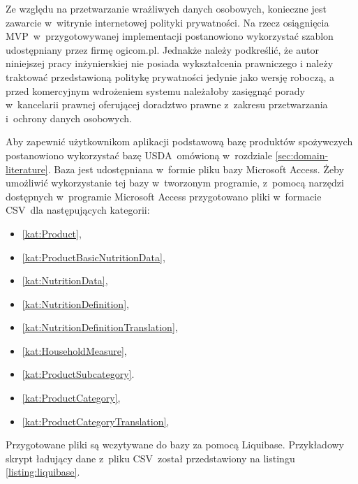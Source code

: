 \par
Ze względu na przetwarzanie wrażliwych danych osobowych, konieczne jest zawarcie w~witrynie internetowej polityki prywatności.
Na rzecz osiągnięcia MVP~w~przygotowywanej implementacji postanowiono wykorzystać szablon udostępniany przez firmę ogicom.pl\cite{url:ogicom-privacy-policy}.
Jednakże należy podkreślić, że autor niniejszej pracy inżynierskiej nie posiada wykształcenia prawniczego
i należy traktować przedstawioną politykę prywatności jedynie jako wersję roboczą,
a przed komercyjnym wdrożeniem systemu należałoby zasięgnąć porady w~kancelarii prawnej oferującej doradztwo prawne z~zakresu przetwarzania i~ochrony danych osobowych.

\par
Aby zapewnić użytkownikom aplikacji podstawową bazę produktów spożywczych postanowiono wykorzystać bazę USDA~omówioną w~rozdziale \ref{sec:domain-literature}.
Baza jest udostępniana w~formie pliku bazy Microsoft Access.
Żeby umożliwić wykorzystanie tej bazy w~tworzonym programie, z~pomocą narzędzi dostępnych w~programie Microsoft Access przygotowano pliki w~formacie CSV~dla następujących kategorii:
\begin{itemize}
    \item\ref{kat:Product},
    \item\ref{kat:ProductBasicNutritionData},
    \item\ref{kat:NutritionData},
    \item\ref{kat:NutritionDefinition},
    \item\ref{kat:NutritionDefinitionTranslation},
    \item\ref{kat:HouseholdMeasure},
    \item\ref{kat:ProductSubcategory}.
    \item\ref{kat:ProductCategory},
    \item\ref{kat:ProductCategoryTranslation},
\end{itemize}

\par
Przygotowane pliki są wczytywane do bazy za pomocą Liquibase.
Przykładowy skrypt ładujący dane z~pliku CSV~został przedstawiony na listingu \ref{listing:liquibase}.

